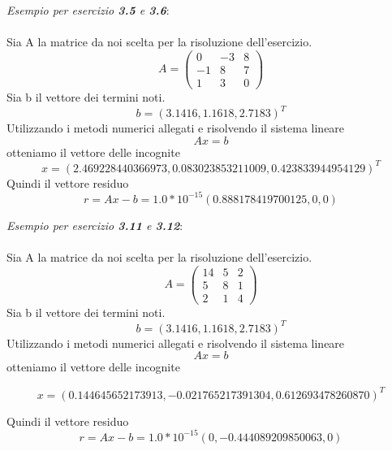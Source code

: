 \textit{Esempio per esercizio \textbf{3.5} e \textbf{3.6}}:\\ \\
Sia A la matrice da noi scelta per la risoluzione dell'esercizio.
\[ A =
\begin{pmatrix}
  0 & -3 & 8 \\
  -1 & 8 & 7 \\
  1 & 3 & 0
 \end{pmatrix}
\]
Sia b il vettore dei termini noti.
\[{b} = (3.1416, 1.1618, 2.7183)^T\]
Utilizzando i metodi numerici allegati e risolvendo il sistema lineare \[Ax = b\] otteniamo il vettore delle incognite
\[x = ( 2.469228440366973,  0.083023853211009,  0.423833944954129)^T\]
Quindi il vettore residuo \[ r = Ax - b = 1.0*10^{-15}( 0.888178419700125,  0,  0)\]


\textit{Esempio per esercizio \textbf{3.11} e \textbf{3.12}}: \\ \\
Sia A la matrice da noi scelta per la risoluzione dell'esercizio.
\[ A =
\begin{pmatrix}
  14 & 5 & 2 \\
  5 & 8 & 1\\
  2 & 1 & 4
 \end{pmatrix}
\]
Sia b il vettore dei termini noti.
\[{b} = (3.1416, 1.1618, 2.7183)^T\]
Utilizzando i metodi numerici allegati e risolvendo il sistema lineare \[Ax = b\] otteniamo il vettore delle incognite

\[x = ( 0.144645652173913,  -0.021765217391304,  0.612693478260870)^T\]

Quindi il vettore residuo \[ r = Ax - b = 1.0*10^{-15}( 0, -0.444089209850063,  0)\]




